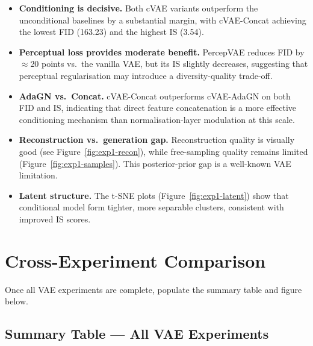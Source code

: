 \documentclass[12pt, a4paper]{article}
\begin{document}
\begin{itemize}
	\item \textbf{Conditioning is decisive.} Both cVAE variants
	outperform the unconditional baselines by a substantial margin,
	with cVAE-Concat achieving the lowest FID (163.23) and the
	highest IS (3.54).
	
	\item \textbf{Perceptual loss provides moderate benefit.}
	PercepVAE reduces FID by $\approx$20 points vs.\ the vanilla
	VAE, but its IS slightly decreases, suggesting that perceptual
	regularisation may introduce a diversity-quality trade-off.
	
	\item \textbf{AdaGN vs.\ Concat.} cVAE-Concat outperforms
	cVAE-AdaGN on both FID and IS, indicating that direct feature
	concatenation is a more effective conditioning mechanism than
	normalisation-layer modulation at this scale.
	
	\item \textbf{Reconstruction vs.\ generation gap.}
	Reconstruction quality is visually good (see
	Figure~\ref{fig:exp1-recon}), while free-sampling quality
	remains limited (Figure~\ref{fig:exp1-samples}). This
	posterior-prior gap is a well-known VAE limitation.
	
	\item \textbf{Latent structure.} The t-SNE plots
	(Figure~\ref{fig:exp1-latent}) show that conditional model
	form tighter, more separable clusters, consistent with
	improved IS scores.
\end{itemize}



\section{Cross-Experiment Comparison}
\label{sec:cross}

\begin{tcolorbox}[colback=yellow!8, colframe=orange!60!black,
                  fonttitle=\bfseries, title={Content placeholder}]
Once all VAE experiments are complete, populate the summary table and
figure below.
\end{tcolorbox}

\subsection{Summary Table — All VAE Experiments}
\end{document}
